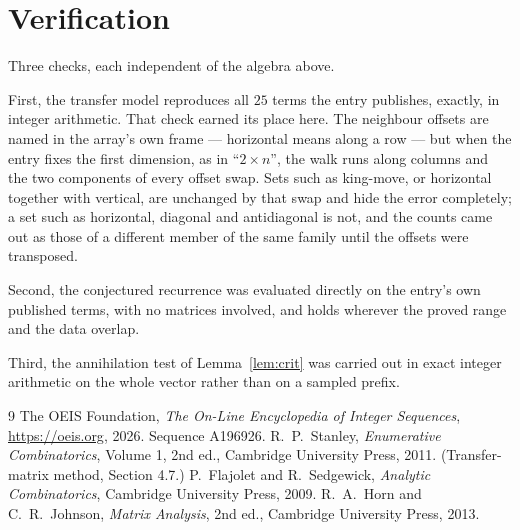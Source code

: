\documentclass[11pt,a4paper]{article}
\theoremstyle{plain}
\theoremstyle{definition}
\begin{document}
\section{Verification}

Three checks, each independent of the algebra above.

First, the transfer model reproduces all $25$ terms the entry publishes, exactly, in
integer arithmetic. That check earned its place here. The neighbour offsets are named in the
array's own frame --- horizontal means along a row --- but when the entry fixes the first
dimension, as in ``$2\times n$'', the walk runs along columns and the two components of every
offset swap. Sets such as king-move, or horizontal together with vertical, are unchanged by
that swap and hide the error completely; a set such as horizontal, diagonal and antidiagonal
is not, and the counts came out as those of a different member of the same family until the
offsets were transposed.

Second, the conjectured recurrence was evaluated directly on the entry's own published terms,
with no matrices involved, and holds wherever the proved range and the data overlap.

Third, the annihilation test of Lemma~\ref{lem:crit} was carried out in exact integer
arithmetic on the whole vector rather than on a sampled prefix.

\begin{thebibliography}{9}
 The OEIS Foundation, \emph{The On-Line Encyclopedia of Integer
Sequences}, \url{https://oeis.org}, 2026. Sequence A196926.
 R.~P.~Stanley, \emph{Enumerative Combinatorics}, Volume 1, 2nd ed.,
Cambridge University Press, 2011. (Transfer-matrix method, Section 4.7.)
 P.~Flajolet and R.~Sedgewick, \emph{Analytic Combinatorics}, Cambridge
University Press, 2009.
 R.~A.~Horn and C.~R.~Johnson, \emph{Matrix Analysis}, 2nd ed., Cambridge
University Press, 2013.
\end{thebibliography}
\end{document}
